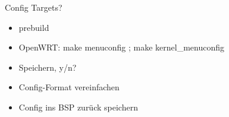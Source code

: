 \begin{frame}{Config Targets?}
    \begin{itemize}
        \item prebuild
        \item OpenWRT: make menuconfig ; make kernel\_menuconfig
        \item Speichern, y/n?
        \item Config-Format vereinfachen
        \item Config ins BSP zurück speichern
    \end{itemize}
\end{frame}

